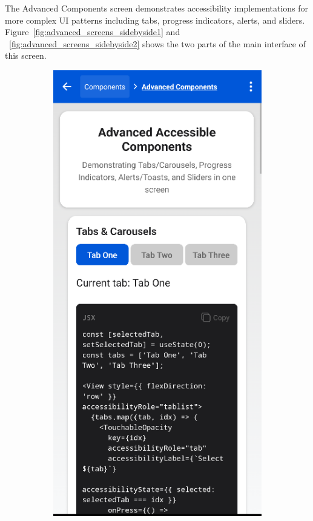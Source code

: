 The Advanced Components screen demonstrates accessibility implementations for more complex UI patterns including tabs, progress indicators, alerts, and sliders. Figure~\ref{fig:advanced_screens_sidebyside1} and ~\ref{fig:advanced_screens_sidebyside2}  shows the two parts of the main interface of this screen.

\begin{figure}[ht]
    \centering
    \begin{subfigure}[b]{0.48\textwidth}
        \centering
        \includegraphics[width=\linewidth, alt={First part of the Advanced Screen}]{img/advanced1.png}

\end{subfigure}
\end{figure}
